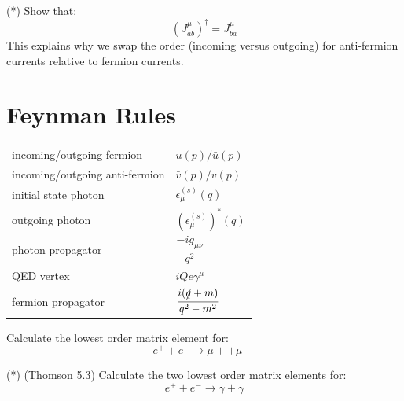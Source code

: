 \documentclass[12pt]{article}
\begin{document}
\exercise (*) Show that:
$$(J^\mu_{ab})^\dagger = J^\mu_{ba}$$
This explains why we swap the order (incoming versus outgoing) for
anti-fermion currents relative to fermion currents.

\section{Feynman Rules}

\begin{center}
\begin{tabular}{ll}
incoming/outgoing fermion & $u(p) / \bar{u}(p)$ \\
incoming/outgoing anti-fermion & $\bar{v}(p) / v(p)$ \\
initial state photon  & $\epsilon_\mu^{(s)}(q)$ \\
outgoing photon       & $(\epsilon_\mu^{(s)})^*(q)$ \\
photon propagator     & $\dfrac{-ig_{\mu\nu}}{q^2}$ \\[8pt]
QED vertex            & $iQe\gamma^\mu$ \\[5pt]
fermion propagator    & $\dfrac{i(\slashed{q} + m)}{q^2 - m^2}$ \\
\end{tabular}
\end{center}

\exercise Calculate the lowest order matrix element for:
$$e^+ + e^- \to \mu+ + \mu-$$

\exercise (*) (Thomson 5.3) Calculate the two lowest order matrix
elements for:
$$e^+ + e^- \to \gamma + \gamma$$
\end{document}
